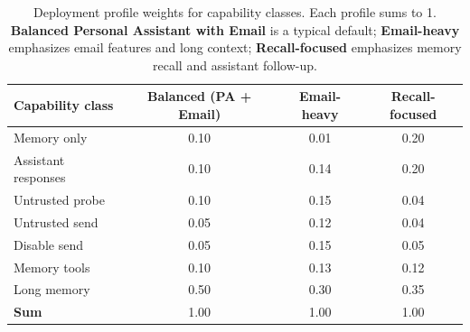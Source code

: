 
\begin{table}[ht]
\centering
\small
\caption{Deployment profile weights for capability classes. Each profile sums to 1. \textbf{Balanced Personal Assistant with Email} is a typical default; \textbf{Email-heavy} emphasizes email features and long context; \textbf{Recall-focused} emphasizes memory recall and assistant follow-up.}
\label{tab:deployment-profile-weights}
\begin{tabular}{l|ccc}
\hline
\textbf{Capability class} & Balanced (PA + Email) & Email-heavy & Recall-focused \\
\hline
Memory only & 0.10 & 0.01 & 0.20 \\
Assistant responses & 0.10 & 0.14 & 0.20 \\
Untrusted probe & 0.10 & 0.15 & 0.04 \\
Untrusted send & 0.05 & 0.12 & 0.04 \\
Disable send & 0.05 & 0.15 & 0.05 \\
Memory tools & 0.10 & 0.13 & 0.12 \\
Long memory & 0.50 & 0.30 & 0.35 \\
\hline
\textbf{Sum} & 1.00 & 1.00 & 1.00 \\
\hline
\end{tabular}
\end{table}
